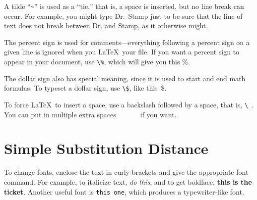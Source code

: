 A tilde ``\verb+~+'' is used as a ``tie,'' that is, a space is inserted, but no line break can occur.
For example, you might type Dr.~Stamp just to be sure that the line of text
does not break between Dr. and Stamp, as it otherwise might.

The percent sign is used for comments---everything following a percent sign 
on a given line is ignored when you \LaTeX\ your file. %
If you want a percent sign to appear in your document, use \verb+\%+, 
which will give you this \%.

The dollar sign also has special meaning, since it is used to start and end
math formulas. To typeset a dollar sign, use \verb+\$+, like this~\$.

To force \LaTeX\ to insert a space, use a backslash followed by
a space, that is, \verb+\ +. You can put in multiple extra spaces\ \ \ \ \ \ \ if you want.

\section{Simple Substitution Distance}

To change fonts, enclose the text in curly brackets and give the appropriate font command.
For example, to italicize text, {\it do this}, and to get boldface, {\bf this is the ticket}.
Another useful font is {\tt this one}, which produces a typewriter-like font.

